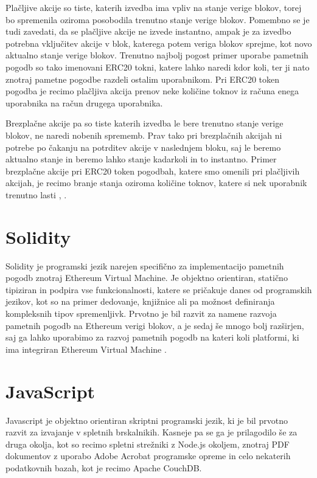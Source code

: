 \documentclass[a4paper,12pt,openright]{book}
\begin{document}
Plačljive akcije so tiste, katerih izvedba ima vpliv na stanje verige blokov, torej bo spremenila oziroma posobodila trenutno stanje verige blokov.
Pomembno se je tudi zavedati, da se plačljive akcije ne izvede instantno, ampak je za izvedbo potrebna vključitev akcije v blok, katerega potem veriga blokov sprejme, kot novo aktualno stanje verige blokov.
Trenutno najbolj pogost primer uporabe pametnih pogodb so tako imenovani ERC20 tokni, katere lahko naredi kdor koli, ter ji nato znotraj pametne pogodbe razdeli ostalim uporabnikom. Pri ERC20 token pogodba je recimo plačljiva akcija prenov neke količine toknov iz računa enega uporabnika na račun drugega uporabnika.

Brezplačne akcije pa so tiste katerih izvedba le bere trenutno stanje verige blokov, ne naredi nobenih sprememb.
Prav tako pri brezplačnih akcijah ni potrebe po čakanju na potrditev akcije v naslednjem bloku, saj le beremo aktualno stanje in beremo lahko stanje kadarkoli in to instantno.
Primer brezplačne akcije pri ERC20 token pogodbah, katere smo omenili pri plačljivih akcijah, je recimo branje stanja oziroma količine toknov, katere si nek uporabnik trenutno lasti \cite{eth_smart_contract_intro}, \cite{erc20_token_standard}.

\section{Solidity}
Solidity je programski jezik narejen specifično za implementacijo pametnih pogodb znotraj Ethereum Virtual Machine.
Je objektno orientiran, statično tipiziran in podpira vse funkcionalnosti, katere se pričakuje danes od programskih jezikov,
kot so na primer dedovanje, knjižnice ali pa možnost definiranja kompleksnih tipov spremenljivk.
Prvotno je bil razvit za namene razvoja pametnih pogodb na Ethereum verigi blokov, a je sedaj še mnogo bolj razširjen,
saj ga lahko uporabimo za razvoj pametnih pogodb na kateri koli platformi, ki ima integriran Ethereum Virtual Machine \cite{solidity_docs}.

\section{JavaScript}
Javascript je objektno orientiran skriptni programski jezik, ki je bil prvotno razvit za izvajanje v spletnih brskalnikih.
Kasneje pa se ga je prilagodilo še za druga okolja, kot so recimo spletni strežniki z Node.js okoljem, znotraj PDF
dokumentov z uporabo Adobe Acrobat programske opreme in celo nekaterih podatkovnih bazah, kot je recimo Apache CouchDB.
\end{document}
